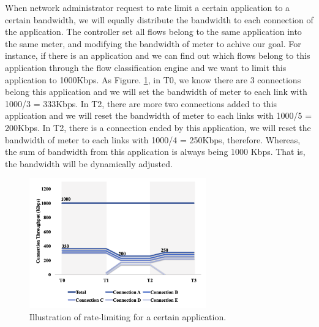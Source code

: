 \documentclass[journal]{IEEEtran}
\begin{document}
When network administrator request to rate limit a certain application to a certain bandwidth, we will equally distribute the bandwidth to each connection of the application. The controller set all flows belong to the same application into the same meter, and modifying the bandwidth of meter to achive our goal. For instance, if there is an application and we can find out which flows belong to this application through the flow classification engine and we want to limit this application to 1000Kbps. As Figure. \ref{fig:mft_qos_rate_app}, in T0, we know there are 3 connections belong this application and we will set the bandwidth of meter to each link with 1000/3 = 333Kbps. In T2, there are more two connections added to this application and we will reset the bandwidth of meter to each links with 1000/5 = 200Kbps. In T2, there is a connection ended by this application, we will reset the bandwidth of meter to each links with 1000/4 = 250Kbps, therefore. Whereas, the sum of bandwidth from this application is always being 1000 Kbps. That is, the bandwidth will be dynamically adjusted.

\begin{figure}[!t]
\centering
\includegraphics[width=3in]{./figures/mft_qos_rate_app}
\caption{Illustration of rate-limiting for a certain application.}
\label{fig:mft_qos_rate_app}
\end{figure}
\end{document}
